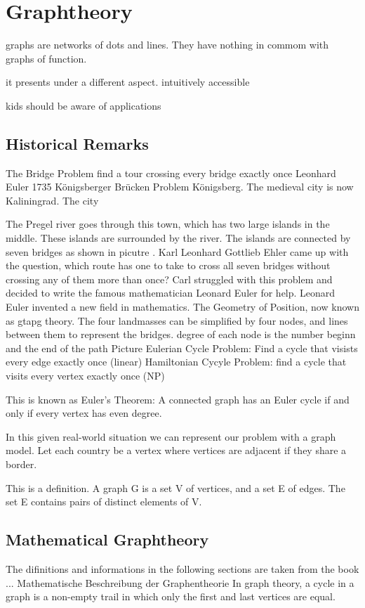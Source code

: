 \chapter{Graphtheory}\label{sec:geo}
graphs are networks of dots and lines. They have nothing in commom with graphs of function.

it presents under a different aspect.
intuitively accessible

kids should be aware of applications

\section{Historical Remarks}\label{sec:geoobj}
The Bridge Problem
find a tour crossing every bridge exactly once 
Leonhard Euler 1735
K\"onigsberger Br\"ucken Problem
K\"onigsberg. The medieval city is now Kaliningrad. The city 

The Pregel river goes through this town, which has two large islands in the middle. These islands are surrounded by the river. The islands are connected by seven bridges as shown in picutre .
Karl Leonhard Gottlieb Ehler came up with the question, which route has one to take to cross all seven bridges without crossing any of them more than once? Carl struggled with this problem and decided to write the famous mathematician Leonard Euler for help.
Leonard Euler invented a new field in mathematics. The Geometry of Position, now known as gtapg theory.
The four landmasses can be simplified by four nodes, and lines between them to represent the bridges.
degree of each node is the number 
beginn and the end of the path
Picture 
Eulerian Cycle Problem: Find a cycle that visists every edge exactly once (linear)
Hamiltonian Cycyle Problem: find a cycle that visits every vertex exactly once (NP)

This is known as Euler's Theorem:
    A connected graph has an Euler cycle if and only if every vertex has even degree.

In this given real-world situation we can represent our problem with a graph model.
Let each country be a vertex where vertices are adjacent if they share a border.    
    
\begin{definition}
  This is a definition.
  A graph G is a set V of vertices, and a set E of edges. The set E contains pairs of distinct elements of V.
\end{definition}    
    
\section{Mathematical Graphtheory}\label{sec:works}
The difinitions and informations in the following sections are taken from the book ...
Mathematische Beschreibung der Graphentheorie
In graph theory, a cycle in a graph is a non-empty trail in which only the first and last vertices are equal.

